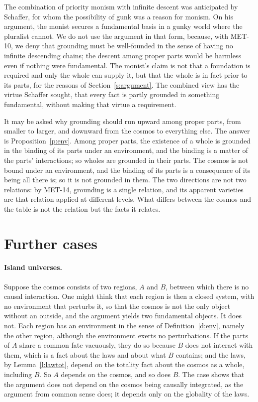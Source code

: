 \documentclass{situationist-preprint}
\begin{document}
The combination of priority monism with infinite descent was anticipated by Schaffer, for whom the possibility of gunk was a reason for monism. On his argument, the monist secures a fundamental basis in a gunky world where the pluralist cannot. We do not use the argument in that form, because, with MET-10, we deny that grounding must be well-founded in the sense of having no infinite descending chains; the descent among proper parts would be harmless even if nothing were fundamental. The monist's claim is not that a foundation is required and only the whole can supply it, but that the whole is in fact prior to its parts, for the reasons of Section~\ref{s:argument}. The combined view has the virtue Schaffer sought, that every fact is partly grounded in something fundamental, without making that virtue a requirement.

It may be asked why grounding should run upward among proper parts, from smaller to larger, and downward from the cosmos to everything else. The answer is Proposition~\ref{p:env}. Among proper parts, the existence of a whole is grounded in the binding of its parts under an environment, and the binding is a matter of the parts' interactions; so wholes are grounded in their parts. The cosmos is not bound under an environment, and the binding of its parts is a consequence of its being all there is; so it is not grounded in them. The two directions are not two relations: by MET-14, grounding is a single relation, and its apparent varieties are that relation applied at different levels. What differs between the cosmos and the table is not the relation but the facts it relates.

\section{Further cases}\label{s:cases}

\paragraph{Island universes.} Suppose the cosmos consists of two regions, $A$ and $B$, between which there is no causal interaction. One might think that each region is then a closed system, with no environment that perturbs it, so that the cosmos is not the only object without an outside, and the argument yields two fundamental objects. It does not. Each region has an environment in the sense of Definition~\ref{d:env}, namely the other region, although the environment exerts no perturbations. If the parts of $A$ share a common fate vacuously, they do so because $B$ does not interact with them, which is a fact about the laws and about what $B$ contains; and the laws, by Lemma~\ref{l:lawtot}, depend on the totality fact about the cosmos as a whole, including $B$. So $A$ depends on the cosmos, and so does $B$. The case shows that the argument does not depend on the cosmos being causally integrated, as the argument from common sense does; it depends only on the globality of the laws.
\end{document}
